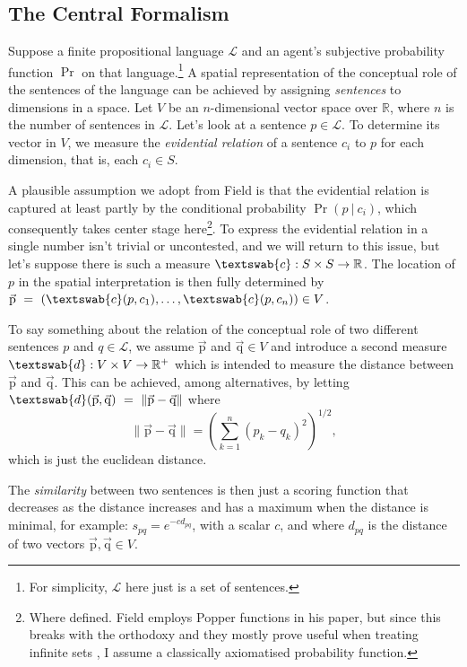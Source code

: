 \documentclass[11pt, a4paper]{scrartcl}
\renewcommand{\i}[1]{\emph{#1}}
\renewcommand{\L}{\mathcal{L}}
\renewcommand{\v}[1]{\vec{\mathrm{#1}}}
\newcommand{\m}[1]{\textswab{#1}}
\newcommand{\given}[1][]{\:#1\vert\:}
\begin{document}
\subsection{The Central Formalism}\label{sec:central}
Suppose a finite propositional language $\L$ and an agent's subjective probability function $\Pr$ on that language.\footnote{For simplicity, $\L$ here just is a set of sentences.} A spatial representation of the conceptual role of the sentences of the language can be achieved by assigning \i{sentences} to dimensions in a space. Let $V$ be an $n$-dimensional vector space over $\mathbb{R}$, where $n$ is the number of sentences in $\L$. Let's look at a sentence $p \in \L$. To determine its vector in $V$, we measure the \i{evidential relation} of a sentence $c_i$ to $p$ for each dimension, that is, each $c_i \in S$. 

A plausible assumption we adopt from Field is that the evidential relation is captured at least partly by the conditional probability $\Pr(p \given c_i)$, which consequently takes center stage here\footnote{Where defined. Field employs Popper functions in his paper, but since this breaks with the orthodoxy and they mostly prove useful when treating infinite sets \parencite[1352]{Leitgeb2013-LEIRBS}, I assume a classically axiomatised probability function.}. To express the evidential relation in a single number isn't trivial or uncontested, and we will return to this issue, but let's suppose there is such a measure $\m{c}: S \times S \rightarrow \mathbb{R}$. The location of $p$ in the spatial interpretation is then fully determined by $\v{p}~=~(\m{c}({p, c_1}),\dots, \m{c}(p, c_n)) \in V$.

To say something about the relation of the conceptual role of two different sentences $p$ and $q \in \L$, we assume $\v{p}$ and $\v{q} \in V$ and introduce a second measure $\m{d}: V \times V \rightarrow \mathbb{R}^+$ which is intended to measure the distance between $\v{p}$ and $\v{q}$. This can be achieved, among alternatives, by letting ${\m{d}(\v{p}, \v{q})~=~\lVert \v{p} - \v{q} \rVert}$ where 
\[
    \lVert \v{p}-\v{q} \rVert = {\left( \sum_{k=1}^n {(p_k-q_k)}^2 \right)}^{1/2}, 
\]
which is just the euclidean distance. 

The \i{similarity} between two sentences is then just a scoring function that decreases as the distance increases and has a maximum when the distance is minimal, for example: $s_{pq} = e^{-cd_{pq}}$, with a scalar $c$, and where $d_{pq}$ is the distance of two vectors $\v{p}, \v{q} \in V$. 
\end{document}
